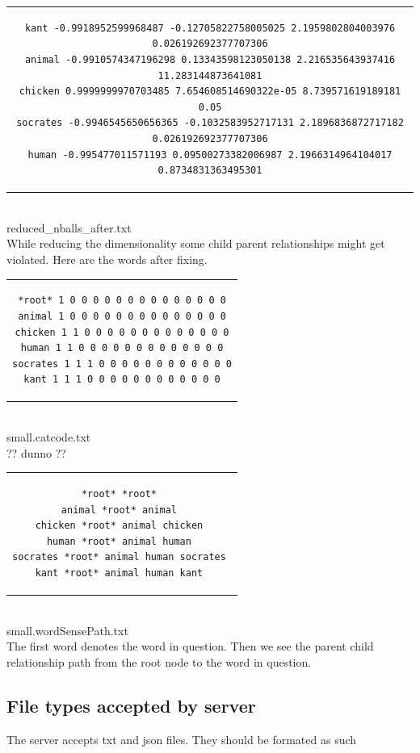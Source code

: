 \documentclass[]{article}
\begin{document}
\begin{center}
\begin{tabular}{c}
\begin{lstlisting}
kant -0.9918952599968487 -0.12705822758005025 2.1959802804003976 0.026192692377707306
animal -0.9910574347196298 0.13343598123050138 2.216535643937416 11.283144873641081
chicken 0.9999999970703485 7.654608514690322e-05 8.739571619189181 0.05
socrates -0.9946545650656365 -0.1032583952717131 2.1896836872717182 0.026192692377707306
human -0.995477011571193 0.09500273382006987 2.1966314964104017 0.8734831363495301
\end{lstlisting}
\end{tabular}
\\reduced\_nballs\_after.txt
\\While reducing the dimensionality some child parent relationships might get violated. Here are the words after fixing.

\begin{tabular}{c}
\begin{lstlisting}
*root* 1 0 0 0 0 0 0 0 0 0 0 0 0 0 0
animal 1 0 0 0 0 0 0 0 0 0 0 0 0 0 0
chicken 1 1 0 0 0 0 0 0 0 0 0 0 0 0 0
human 1 1 0 0 0 0 0 0 0 0 0 0 0 0 0
socrates 1 1 1 0 0 0 0 0 0 0 0 0 0 0 0
kant 1 1 1 0 0 0 0 0 0 0 0 0 0 0 0
\end{lstlisting}
\end{tabular}
\\small.catcode.txt
\\ ?? dunno ??


\begin{tabular}{c}
\begin{lstlisting}
*root* *root* 
animal *root* animal 
chicken *root* animal chicken 
human *root* animal human 
socrates *root* animal human socrates 
kant *root* animal human kant 

\end{lstlisting}
\end{tabular}
\\small.wordSensePath.txt
\\The first word denotes the word in question. Then we see the parent child relationship path from the root node to the word in question.

\end{center}

\subsection{File types accepted by server}
The server accepts txt and json files. They should be formated as such
\end{document}
